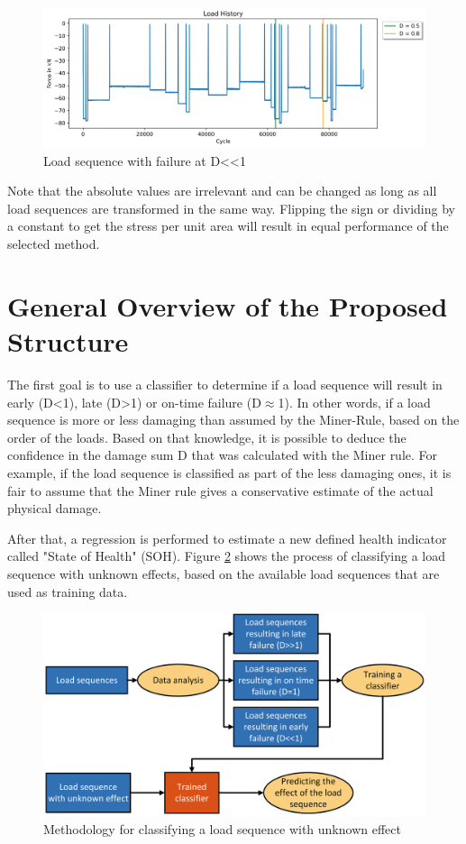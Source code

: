 \begin{figure}[H]
	\centering
	\includegraphics[width=1\linewidth]{IMGs/Load/L2.jpg}
	\caption{Load sequence with failure at D<<1}
	\label{fig:L3}
\end{figure}

Note that the absolute values are irrelevant and can be changed as long as all load sequences are transformed in the same way. Flipping the sign or dividing by a constant to get the stress per unit area will result in equal performance of the selected method.
\newpage
\section{General Overview of the Proposed Structure}\label{GO}
The first goal is to use a classifier to determine if a load sequence will result in early (D<1), late (D>1) or on-time failure (D$\approx$1). In other words, if a load sequence is more or less damaging than assumed by the Miner-Rule, based on the order of the loads. Based on that knowledge, it is possible to deduce the confidence in the damage sum D that was calculated with the Miner rule. For example, if the load sequence is classified as part of the less damaging ones, it is fair to assume that the Miner rule gives a conservative estimate of the actual physical damage. 

After that, a regression is performed to estimate a new defined health indicator called "State of Health" (SOH). 
Figure \ref{fig:GeneralMethod1} shows the process of classifying a load sequence with unknown effects, based on the available load sequences that are used as training data. 

\begin{figure}[H]
	\centering
	\includegraphics[width=0.95\linewidth]{IMGs/Method1.png}
	\caption{Methodology for classifying a load sequence with unknown effect}
	\label{fig:GeneralMethod1}
\end{figure}

